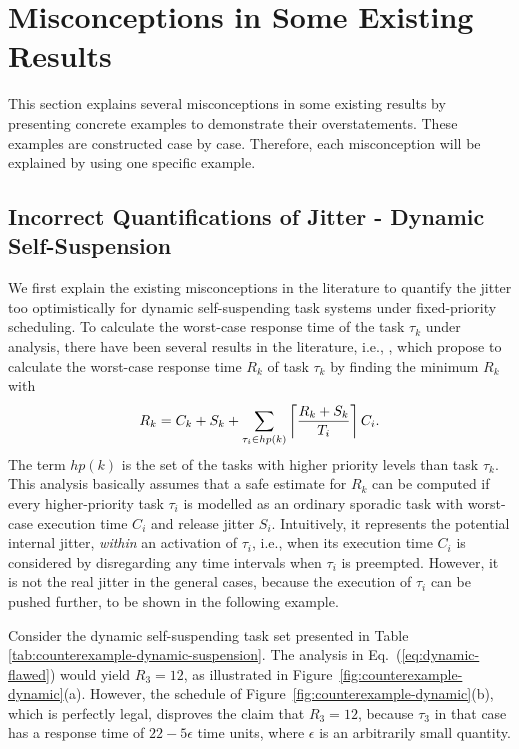 
\section{Misconceptions in Some Existing Results}
\label{sec:misconceptions}

This section explains several misconceptions in some existing results by presenting concrete examples to demonstrate their overstatements. These examples are constructed case by case. Therefore, each misconception will be explained by using one specific example. 

\subsection{Incorrect Quantifications of Jitter - Dynamic Self-Suspension}
\label{sec:wrong-jitter-dynamic}

We first explain the existing misconceptions in the literature to quantify the jitter too optimistically for dynamic self-suspending task systems under fixed-priority scheduling. To calculate the worst-case response time of the task $\tau_k$ under analysis, there have been several results in the literature, i.e., \cite{ECRTS-AudsleyB04,RTAS-AudsleyB04,RTCSA-KimCPKH95,MingLiRTCSA1994},  which propose to calculate the worst-case response time $R_k$ of task $\tau_k$ by finding the minimum $R_k$ with
\begin{equation}
R_k = C_k+ S_k+\sum_{\tau_i \in hp(k)}\left\lceil{\frac{R_k+S_k}{T_i}}\right\rceil C_i.
\label{eq:dynamic-flawed}
\end{equation}
The term $hp(k)$ is the set of the tasks with higher priority levels than task $\tau_k$. 
This analysis basically assumes that a safe estimate for $R_k$ can be computed if
every higher-priority task $\tau_i$ is modelled as an ordinary sporadic
task with worst-case execution time $C_i$ and release jitter $S_i$.
Intuitively, it represents the potential internal jitter, \textit{within} an activation of $\tau_i$, i.e., when its execution time $C_i$ is considered by disregarding any time intervals when $\tau_i$ is preempted. 
However, it is not the real jitter in the general cases, because the execution of $\tau_i$ can be pushed further, to be shown in the following example.


Consider the dynamic self-suspending task set presented in Table \ref{tab:counterexample-dynamic-suspension}. 
The analysis in Eq.~(\ref{eq:dynamic-flawed}) would yield $R_3=12$, as illustrated in 
Figure~\ref{fig:counterexample-dynamic}(a). However, the schedule of Figure~\ref{fig:counterexample-dynamic}(b), which is perfectly legal, 
disproves the claim that $R_3=12$, because $\tau_3$ in that case has a response time of $22-5\epsilon$ time units, 
where $\epsilon$ is an arbitrarily small quantity. 

